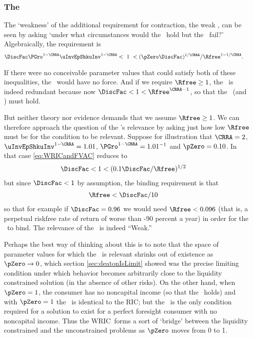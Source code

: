 \documentclass[BufferStockTheory]{subfiles}
\begin{document}
\subsubsection{The \WRIC}

The `weakness' of the additional requirement for contraction, the
weak \RIC, can be seen by asking `under what circumstances
would the \FVAC~hold but the \WRIC~fail?'
Algebraically, the requirement is
\begin{align}
  \DiscFac \PGro^{1-\CRRA}\uInvEpShkuInv^{1-\CRRA} & < ~ 1 ~ <  (\pZero \DiscFac)^{1/\CRRA}/\Rfree^{1-1/\CRRA}. \label{eq:WRICandFVAC}
\end{align}

If there were no conceivable parameter values that could satisfy both
of these inequalities, the \WRIC~would have no force.  And if we require $\Rfree \geq 1$, the \WRIC~is indeed
redundant because now $\DiscFac <1<\Rfree^{\CRRA-1}$, so that the \RIC~(and \WRIC) must hold.

But neither theory nor evidence demands that we assume $\Rfree \geq
1$.  We can therefore approach the question of the \WRIC's relevance by
asking just how low $\Rfree$ must be for the condition to be relevant.
Suppose for illustration that $\CRRA=2$, $\uInvEpShkuInv^{1-\CRRA}=1.01$,
$\PGro^{1-\CRRA}=1.01^{-1}$ and $\pZero = 0.10$.  In that case
\eqref{eq:WRICandFVAC} reduces to
\begin{align*}
  \DiscFac  & < 1 < (0.1 \DiscFac/\Rfree)^{1/2} 
\end{align*}
but since $\DiscFac < 1$ by assumption, the binding requirement is that
\begin{align*}
  \Rfree  & < \DiscFac/10 \notag
\end{align*}
so that for example if $\DiscFac=0.96$ we would need $\Rfree < 0.096$
(that is, a perpetual riskfree rate of return of worse than -90
percent a year) in order for the \WRIC~to bind.
The relevance of the \WRIC~is indeed ``Weak.''

Perhaps the best way of thinking about this is to note that the space
of parameter values for which the \WRIC~is relevant shrinks out of
existence as $\pZero \rightarrow 0$, which section
\ref{sec:deatonIsLimit} showed was the precise limiting condition
under which behavior becomes arbitrarily close to the liquidity
constrained solution (in the absence of other risks).  On the other
hand, when $\pZero = 1$, the consumer has no noncapital income (so
that the \FHWC~holds) and with $\pZero=1$ the \WRIC~is identical to the
RIC; but the \RIC~is
the only condition required for a solution to exist
for a perfect foresight consumer with no noncapital income.  Thus the
WRIC~forms a sort of `bridge' between the liquidity constrained and
the unconstrained problems as $\pZero$ moves from 0 to 1.
\end{document}

